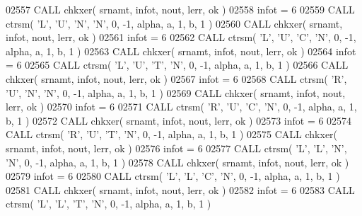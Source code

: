 \begin{DoxyCode}
02557       \textcolor{keyword}{CALL }chkxer( srnamt, infot, nout, lerr, ok )
02558       infot = 6
02559       \textcolor{keyword}{CALL }ctrsm( \textcolor{stringliteral}{'L'}, \textcolor{stringliteral}{'U'}, \textcolor{stringliteral}{'N'}, \textcolor{stringliteral}{'N'}, 0, -1, alpha, a, 1, b, 1 )
02560       \textcolor{keyword}{CALL }chkxer( srnamt, infot, nout, lerr, ok )
02561       infot = 6
02562       \textcolor{keyword}{CALL }ctrsm( \textcolor{stringliteral}{'L'}, \textcolor{stringliteral}{'U'}, \textcolor{stringliteral}{'C'}, \textcolor{stringliteral}{'N'}, 0, -1, alpha, a, 1, b, 1 )
02563       \textcolor{keyword}{CALL }chkxer( srnamt, infot, nout, lerr, ok )
02564       infot = 6
02565       \textcolor{keyword}{CALL }ctrsm( \textcolor{stringliteral}{'L'}, \textcolor{stringliteral}{'U'}, \textcolor{stringliteral}{'T'}, \textcolor{stringliteral}{'N'}, 0, -1, alpha, a, 1, b, 1 )
02566       \textcolor{keyword}{CALL }chkxer( srnamt, infot, nout, lerr, ok )
02567       infot = 6
02568       \textcolor{keyword}{CALL }ctrsm( \textcolor{stringliteral}{'R'}, \textcolor{stringliteral}{'U'}, \textcolor{stringliteral}{'N'}, \textcolor{stringliteral}{'N'}, 0, -1, alpha, a, 1, b, 1 )
02569       \textcolor{keyword}{CALL }chkxer( srnamt, infot, nout, lerr, ok )
02570       infot = 6
02571       \textcolor{keyword}{CALL }ctrsm( \textcolor{stringliteral}{'R'}, \textcolor{stringliteral}{'U'}, \textcolor{stringliteral}{'C'}, \textcolor{stringliteral}{'N'}, 0, -1, alpha, a, 1, b, 1 )
02572       \textcolor{keyword}{CALL }chkxer( srnamt, infot, nout, lerr, ok )
02573       infot = 6
02574       \textcolor{keyword}{CALL }ctrsm( \textcolor{stringliteral}{'R'}, \textcolor{stringliteral}{'U'}, \textcolor{stringliteral}{'T'}, \textcolor{stringliteral}{'N'}, 0, -1, alpha, a, 1, b, 1 )
02575       \textcolor{keyword}{CALL }chkxer( srnamt, infot, nout, lerr, ok )
02576       infot = 6
02577       \textcolor{keyword}{CALL }ctrsm( \textcolor{stringliteral}{'L'}, \textcolor{stringliteral}{'L'}, \textcolor{stringliteral}{'N'}, \textcolor{stringliteral}{'N'}, 0, -1, alpha, a, 1, b, 1 )
02578       \textcolor{keyword}{CALL }chkxer( srnamt, infot, nout, lerr, ok )
02579       infot = 6
02580       \textcolor{keyword}{CALL }ctrsm( \textcolor{stringliteral}{'L'}, \textcolor{stringliteral}{'L'}, \textcolor{stringliteral}{'C'}, \textcolor{stringliteral}{'N'}, 0, -1, alpha, a, 1, b, 1 )
02581       \textcolor{keyword}{CALL }chkxer( srnamt, infot, nout, lerr, ok )
02582       infot = 6
02583       \textcolor{keyword}{CALL }ctrsm( \textcolor{stringliteral}{'L'}, \textcolor{stringliteral}{'L'}, \textcolor{stringliteral}{'T'}, \textcolor{stringliteral}{'N'}, 0, -1, alpha, a, 1, b, 1 )

\end{DoxyCode}
